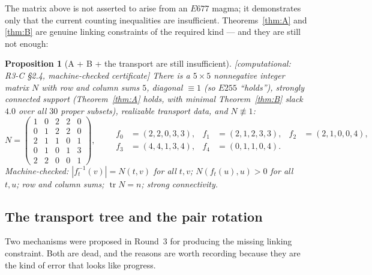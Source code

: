 \documentclass[11pt]{article}
\theoremstyle{plain}
\newtheorem{proposition}[theorem]{Proposition}
\theoremstyle{definition}
\theoremstyle{remark}
\numberwithin{equation}{section}
\newcommand{\tr}{\operatorname{tr}}
\newcommand{\statusbox}[1]{{\small\sloppy\textsf{[#1]}}}
\newcommand{\COMP}[1]{\statusbox{computational: #1}}
\begin{document}
The matrix above is not asserted to arise from an $E677$ magma; it demonstrates only that the
current counting inequalities are insufficient. Theorems~\ref{thm:A} and \ref{thm:B} are
genuine linking constraints of the required kind --- and they are still not enough:

\begin{proposition}[A + B + the transport are still insufficient]\label{prop:certificate}
\COMP{R3-C \S2.4, machine-checked certificate}
There is a $5\times5$ nonnegative integer matrix $N$ with row and column sums $5$, diagonal
$\equiv 1$ (so $E255$ ``holds''), strongly connected support (Theorem~\ref{thm:A} holds, with
minimal Theorem~\ref{thm:B} slack $4.0$ over all $30$ proper subsets), realizable transport
data, and $N\not\equiv 1$:
\[
  N = \begin{pmatrix}
    1&0&2&2&0\\ 0&1&2&2&0\\ 2&1&1&0&1\\ 0&1&0&1&3\\ 2&2&0&0&1
  \end{pmatrix},
  \qquad
  \begin{aligned}
    f_0 &= (2,2,0,3,3), & f_1 &= (2,1,2,3,3), & f_2 &= (2,1,0,0,4),\\
    f_3 &= (4,4,1,3,4), & f_4 &= (0,1,1,0,4). &&
  \end{aligned}
\]
Machine-checked: $|f_t^{-1}(v)| = N(t,v)$ for all $t,v$; $N(f_t(u),u)>0$ for all $t,u$; row
and column sums; $\tr N = n$; strong connectivity.
\end{proposition}

\subsection{The transport tree and the pair rotation}\label{sec:blocktransport}

Two mechanisms were proposed in Round~3 for producing the missing linking constraint. Both are
dead, and the reasons are worth recording because they are the kind of error that looks like
progress.
\end{document}
